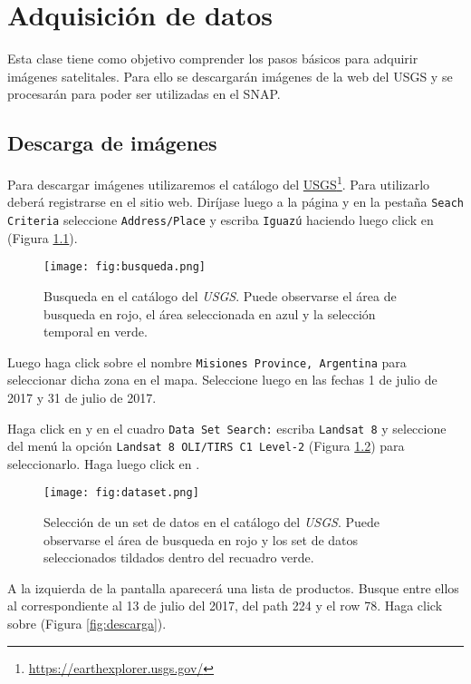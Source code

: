 \chapter{Adquisición de datos}

Esta clase tiene como objetivo comprender los pasos básicos para adquirir imágenes satelitales. Para ello se descargarán imágenes de la web del USGS y se procesarán para poder ser utilizadas en el SNAP.

\section{Descarga de imágenes}

Para descargar imágenes utilizaremos el catálogo del \href{https://earthexplorer.usgs.gov/}{USGS}\footnote{\href{https://earthexplorer.usgs.gov/}{https://earthexplorer.usgs.gov/}}. Para utilizarlo deberá registrarse en el sitio web. Diríjase luego a la página y en la pestaña \texttt{Seach Criteria} seleccione \texttt{Address/Place} y escriba \texttt{Iguazú} haciendo luego click en  (Figura \ref{fig:busqueda}).

\begin{figure}[h!]
    \centering
    \texttt{[image: fig:busqueda.png]}
    \caption{Busqueda en el catálogo del \emph{USGS}. Puede observarse el área de busqueda en rojo, el área seleccionada en azul y la selección temporal en verde.}
    \label{fig:busqueda}
\end{figure}

Luego haga click sobre el nombre \texttt{Misiones Province, Argentina} para seleccionar dicha zona en el mapa. Seleccione luego en  las fechas 1 de julio de 2017 y 31 de julio de 2017.

Haga click en  y en el cuadro \texttt{Data Set Search:} escriba \texttt{Landsat 8} y seleccione del menú la opción \texttt{Landsat 8 OLI/TIRS C1 Level-2} (Figura \ref{fig:dataset}) para seleccionarlo. Haga luego click en .

\begin{figure}[h!]
    \centering
    \texttt{[image: fig:dataset.png]}
    \caption{Selección de un set de datos en el catálogo del \emph{USGS}. Puede observarse el área de busqueda en rojo y los set de datos seleccionados tildados dentro del recuadro verde.}
    \label{fig:dataset}
\end{figure}

A la izquierda de la pantalla aparecerá una lista de productos. Busque entre ellos al correspondiente al 13 de julio del 2017, del path 224 y el row 78. Haga click sobre  (Figura \ref{fig:descarga}).

